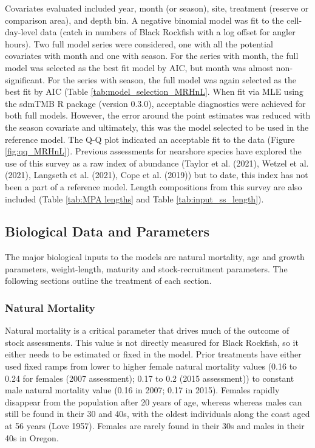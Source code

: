 \documentclass[11pt,
  english,
  letterpaper,
]{article}
\begin{document}
Covariates evaluated included year, month (or season), site, treatment (reserve or comparison area), and depth bin. A negative binomial model was fit to the cell-day-level data (catch in numbers of Black Rockfish with a log offset for angler hours). Two full model series were considered, one with all the potential covariates with month and one with season. For the series with month, the full model was selected as the best fit model by AIC, but month was almost non-significant. For the series with season, the full model was again selected as the best fit by AIC (Table \ref{tab:model_selection_MRHnL}. When fit via MLE using the sdmTMB R package (version 0.3.0), acceptable diagnostics were achieved for both full models. However, the error around the point estimates was reduced with the season covariate and ultimately, this was the model selected to be used in the reference model. The Q-Q plot indicated an acceptable fit to the data (Figure \ref{fig:qq_MRHnL}). Previous assessments for nearshore species have explored the use of this survey as a raw index of abundance (Taylor et al. (2021), Wetzel et al. (2021), Langseth et al. (2021), Cope et al. (2019)) but to date, this index has not been a part of a reference model. Length compositions from this survey are also included (Table \ref{tab:MPA lengths} and Table \ref{tab:input_ss_length}).

\hypertarget{biological-data-and-parameters}{%
\subsection{Biological Data and Parameters}\label{biological-data-and-parameters}}

The major biological inputs to the models are natural mortality, age and growth parameters, weight-length, maturity and stock-recruitment parameters. The following sections outline the treatment of each section.

\hypertarget{natural-mortality}{%
\subsubsection{Natural Mortality}\label{natural-mortality}}

Natural mortality is a critical parameter that drives much of the outcome of stock assessments. This value is not directly measured for Black Rockfish, so it either needs to be estimated or fixed in the model. Prior treatments have either used fixed ramps from lower to higher female natural mortality values (0.16 to 0.24 for females (2007 assessment); 0.17 to 0.2 (2015 assessment)) to constant male natural mortality value (0.16 in 2007; 0.17 in 2015). Females rapidly disappear from the population after 20 years of age, whereas whereas males can still be found in their 30 and 40s, with the oldest individuals along the coast aged at 56 years (Love 1957). Females are rarely found in their 30s and males in their 40s in Oregon.
\end{document}
